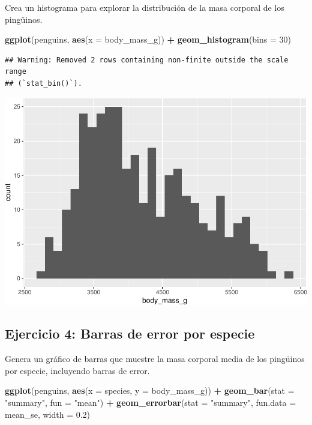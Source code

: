 \documentclass[
]{book}
\newenvironment{Shaded}{\begin{snugshade}}{\end{snugshade}}
\newcommand{\AttributeTok}[1]{\textcolor[rgb]{0.13,0.29,0.53}{#1}}
\newcommand{\DecValTok}[1]{\textcolor[rgb]{0.00,0.00,0.81}{#1}}
\newcommand{\FloatTok}[1]{\textcolor[rgb]{0.00,0.00,0.81}{#1}}
\newcommand{\FunctionTok}[1]{\textcolor[rgb]{0.13,0.29,0.53}{\textbf{#1}}}
\newcommand{\NormalTok}[1]{#1}
\newcommand{\SpecialCharTok}[1]{\textcolor[rgb]{0.81,0.36,0.00}{\textbf{#1}}}
\newcommand{\StringTok}[1]{\textcolor[rgb]{0.31,0.60,0.02}{#1}}
\begin{document}
Crea un histograma para explorar la distribución de la masa corporal de los pingüinos.

\begin{Shaded}
\begin{Highlighting}[]
\FunctionTok{ggplot}\NormalTok{(penguins, }\FunctionTok{aes}\NormalTok{(}\AttributeTok{x =}\NormalTok{ body\_mass\_g)) }\SpecialCharTok{+}
  \FunctionTok{geom\_histogram}\NormalTok{(}\AttributeTok{bins =} \DecValTok{30}\NormalTok{)}
\end{Highlighting}
\end{Shaded}

\begin{verbatim}
## Warning: Removed 2 rows containing non-finite outside the scale range
## (`stat_bin()`).
\end{verbatim}

\includegraphics{bookdown-demo_files/figure-latex/unnamed-chunk-179-1.pdf}

\hypertarget{ejercicio-4-barras-de-error-por-especie}{%
\subsection{Ejercicio 4: Barras de error por especie}\label{ejercicio-4-barras-de-error-por-especie}}

Genera un gráfico de barras que muestre la masa corporal media de los pingüinos por especie, incluyendo barras de error.

\begin{Shaded}
\begin{Highlighting}[]
\FunctionTok{ggplot}\NormalTok{(penguins, }\FunctionTok{aes}\NormalTok{(}\AttributeTok{x =}\NormalTok{ species, }\AttributeTok{y =}\NormalTok{ body\_mass\_g)) }\SpecialCharTok{+}
  \FunctionTok{geom\_bar}\NormalTok{(}\AttributeTok{stat =} \StringTok{"summary"}\NormalTok{, }\AttributeTok{fun =} \StringTok{"mean"}\NormalTok{) }\SpecialCharTok{+}
  \FunctionTok{geom\_errorbar}\NormalTok{(}\AttributeTok{stat =} \StringTok{"summary"}\NormalTok{, }\AttributeTok{fun.data =}\NormalTok{ mean\_se, }\AttributeTok{width =} \FloatTok{0.2}\NormalTok{)}
\end{Highlighting}
\end{Shaded}
\end{document}
